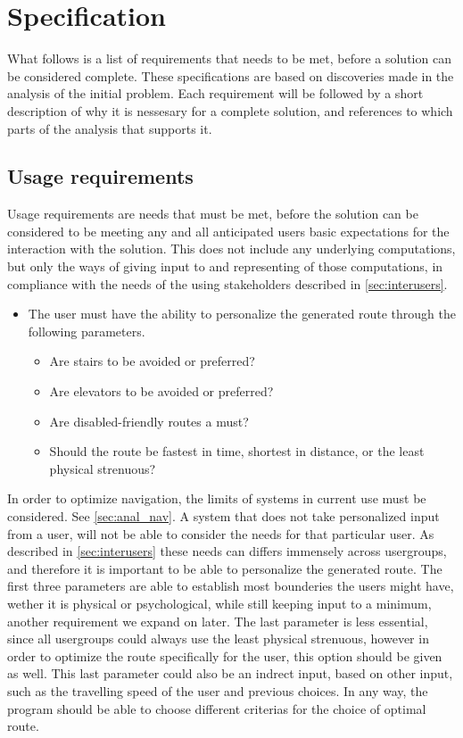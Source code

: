 \section{Specification} %
\label{sec:specification}

What follows is a list of requirements that needs to be met, before a solution can be considered complete. These specifications are based on discoveries made in the analysis of the initial problem. Each requirement will be followed by a short description of why it is nessesary for a complete solution, and references to which parts of the analysis that supports it.

\subsection{Usage requirements}

Usage requirements are needs that must be met, before the solution can be considered to be meeting any and all anticipated users basic expectations for the interaction with the solution. This does not include any underlying computations, but only the ways of giving input to and representing of those computations, in compliance with the needs of the using stakeholders described in \cref{sec:interusers}.

\begin{itemize}
	\item The user must have the ability to personalize the generated route through the following parameters.
			\begin{itemize}
				\item Are stairs to be avoided or preferred?
				\item Are elevators to be avoided or preferred?
				\item Are disabled-friendly routes a must?
				\item Should the route be fastest in time, shortest in distance, or the least physical strenuous?
			\end{itemize}
\end{itemize}
In order to optimize navigation, the limits of systems in current use must be considered. See \cref{sec:anal_nav}. A system that does not take personalized input from a user, will not be able to consider the needs for that particular user. As described in \cref{sec:interusers} these needs can differs immensely across usergroups, and therefore it is important to be able to personalize the generated route.
The first three parameters are able to establish most bounderies the users might have, wether it is physical or psychological, while still keeping input to a minimum, another requirement we expand on later. The last parameter is less essential, since all usergroups could always use the least physical strenuous, however in order to optimize the route specifically for the user, this option should be given as well. This last parameter could also be an indrect input, based on other input, such as the travelling speed of the user and previous choices. In any way, the program should be able to choose different criterias for the choice of optimal route.

